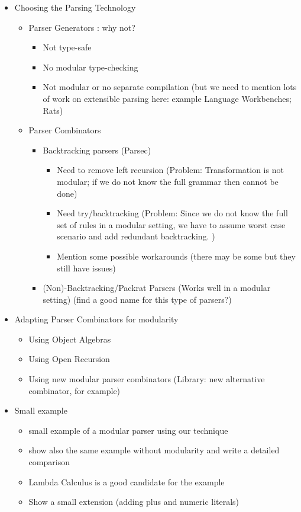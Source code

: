 \begin{itemize}
\item Choosing the Parsing Technology
    \begin{itemize}
    \item Parser Generators : why not?
        \begin{itemize}
            \item Not type-safe
            \item No modular type-checking
            \item Not modular or no separate compilation (but we need to mention lots of work on extensible parsing here: example Language Workbenches; Rats)
        \end{itemize}
    \item Parser Combinators
        \begin{itemize}
        \item Backtracking parsers (Parsec)
            \begin{itemize}
            \item Need to remove left recursion (Problem: Transformation is not modular; if we do not know the full grammar then cannot be done)
            \item Need try/backtracking (Problem: Since we do not know the full set of rules in a modular setting, we have to assume worst case scenario and add redundant backtracking. )
            \item Mention some possible workarounds (there may be some but they still have issues)
            \end{itemize}
        \item (Non)-Backtracking/Packrat Parsers (Works well in a modular setting) (find a good name for this type of parsers?)
        \end{itemize}
    \end{itemize}
\item Adapting Parser Combinators for modularity
    \begin{itemize}
    \item Using Object Algebras
    \item Using Open Recursion
    \item Using new modular parser combinators (Library: new alternative combinator, for example)
    \end{itemize}
\item Small example
    \begin{itemize}
    \item small example of a modular parser using our technique
    \item show also the same example without modularity and write a detailed comparison
    \item Lambda Calculus is a good candidate for the example
    \item Show a small extension (adding plus and numeric literals)
    \end{itemize}
\end{itemize}
